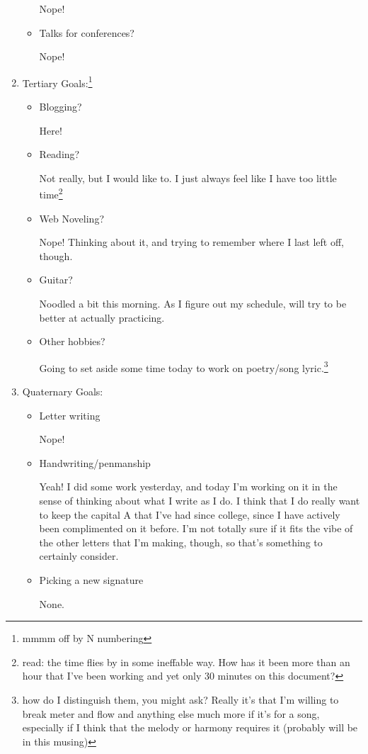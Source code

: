 \documentclass[12pt]{article}
\renewcommand{\,}{\textsuperscript{,}}
\begin{document}
\begin{enumerate}
\begin{itemize}
Nope!

\item Talks for conferences?

Nope!

\end{itemize}

\item Tertiary Goals:\footnote{mmmm off by N numbering}

\begin{itemize}

\item Blogging?

Here!

\item Reading?

Not really, but I would like to. I just always feel like I have too little time\footnote{read: the time flies by in some ineffable way. How has it been more than an hour that I've been working and yet only 30 minutes on this document?}

\item Web Noveling?

Nope! Thinking about it, and trying to remember where I last left off, though.

\item Guitar?

Noodled a bit this morning. As I figure out my schedule, will try to be better at actually practicing.

\item Other hobbies?

Going to set aside some time today to work on poetry/song lyric.\footnote{how do I distinguish them, you might ask? Really it's that I'm willing to break meter and flow and anything else much more if it's for a song, especially if I think that the melody or harmony requires it (probably will be in this musing)}

\end{itemize}

\item Quaternary Goals:

\begin{itemize}

\item Letter writing

Nope!

\item Handwriting/penmanship

Yeah! I did some work yesterday, and today I'm working on it in the sense of thinking about what I write as I do.  
I think that I do really want to keep the capital A that I've had since college, since I have actively been complimented on it before.  
I'm not totally sure if it fits the vibe of the other letters that I'm making, though, so that's something to certainly consider.

\item Picking a new signature

None.

\end{itemize}

\end{enumerate}
\end{document}
